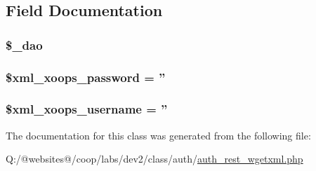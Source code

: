 \subsection{Field Documentation}
\hypertarget{class_xortify_auth_rest___wgetxml_a12a029c610f699b4b25e79a1f64a3485}{
\subsubsection[{\$\-\_\-dao}]{\setlength{\rightskip}{0pt plus 5cm}\$\-\_\-dao}}\label{class_xortify_auth_rest___wgetxml_a12a029c610f699b4b25e79a1f64a3485}
\hypertarget{class_xortify_auth_rest___wgetxml_a8ec2889165c837354fded1cedbd42157}{
\subsubsection[{\$xml\-\_\-xoops\-\_\-password}]{\setlength{\rightskip}{0pt plus 5cm}\$xml\-\_\-xoops\-\_\-password = ''}}\label{class_xortify_auth_rest___wgetxml_a8ec2889165c837354fded1cedbd42157}
\hypertarget{class_xortify_auth_rest___wgetxml_a725df0dd6b578e15522ed15945e5901c}{
\subsubsection[{\$xml\-\_\-xoops\-\_\-username}]{\setlength{\rightskip}{0pt plus 5cm}\$xml\-\_\-xoops\-\_\-username = ''}}\label{class_xortify_auth_rest___wgetxml_a725df0dd6b578e15522ed15945e5901c}


The documentation for this class was generated from the following file\-:\begin{DoxyCompactItemize}
\item 
Q\-:/@websites@/coop/labs/dev2/class/auth/\hyperlink{auth__rest__wgetxml_8php}{auth\-\_\-rest\-\_\-wgetxml.\-php}\end{DoxyCompactItemize}
